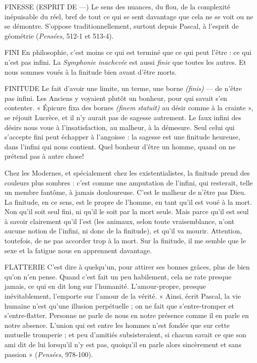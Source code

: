 FINESSE (ESPRIT DE —) Le sens des nuances, du flou, de la complexité
inépuisable du réel, bref de tout ce qui se sent
davantage que cela ne se voit ou ne se démontre. S’oppose traditionnellement,
surtout depuis Pascal, à l'esprit de géométrie ({\it Pensées}, 512-1 et 513-4).

FINI En philosophie, c’est moins ce qui est terminé que ce qui peut l'être :
ce qui n’est pas infini. La {\it Symphonie inachevée} est aussi {\it finie} que toutes
les autres. Et nous sommes voués à la finitude bien avant d’être morts.

FINITUDE Le fait d’avoir une limite, un terme, une borne {\it (finis)} — de n’être
pas infini. Les Anciens y voyaient plutôt un bonheur, pour qui
savait s’en contenter. « Épicure fixa des bornes {\it (finem statuit)} au désir comme à
la crainte », se réjouit Lucrèce, et il n’y aurait pas de sagesse autrement. Le faux
infini des désirs nous voue à l’insatisfaction, au malheur, à la démesure. Seul
celui qui s’accepte fini peut échapper à l'angoisse : la sagesse est une finitude
heureuse, dans l'infini qui nous contient. Quel bonheur d’être un homme,
quand on ne prétend pas à autre chose!

Chez les Modernes, et spécialement chez les existentialistes, la finitude
prend des couleurs plus sombres : c’est comme une amputation de l'infini, qui
resterait, telle un membre fantôme, à jamais douloureuse. C’est le malheur de
n'être pas Dieu. La finitude, en ce sens, est le propre de l’homme, en tant qu’il
est voué à la mort. Non qu’il soit seul fini, ni qu’il le soit par la mort seule.
Mais parce qu’il est seul à savoir clairement qu’il l’est (les animaux, selon toute
vraisemblance, n’ont aucune notion de l'infini, ni donc de la finitude), et qu’il
va mourir. Attention, toutefois, de ne pas accorder trop à la mort. Sur la finitude,
il me semble que le sexe et la fatigue nous en apprennent davantage.

FLATTERIE C'est dire à quelqu'un, pour attirer ses bonnes grâces, plus de
bien qu’on n’en pense. Quand c’est fait un peu habilement,
cela ne rate presque jamais, ce qui en dit long sur l'humanité. L’amour-propre,
presque inévitablement, l'emporte sur l'amour de la vérité. « Ainsi, écrit Pascal,
la vie humaine n’est qu’une illusion perpétuelle ; on ne fait que s’entre-tromper
et s’entre-flatter. Personne ne parle de nous en notre présence comme il en
parle en notre absence. L’union qui est entre les hommes n’est fondée que sur
cette mutuelle tromperie ; et peu d’amitiés subsisteraient, si chacun savait ce
que son ami dit de lui lorsqu'il n’y est pas, quoiqu'il en parle alors sincèrement
et sans passion » ({\it Pensées}, 978-100).

